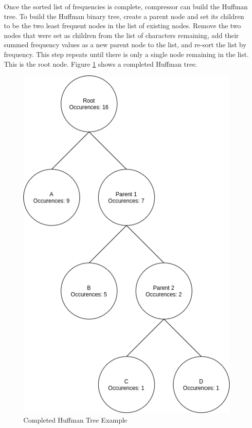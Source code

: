 \documentclass[doublespace,nopageskip]{VTthesis}
\begin{document}
Once the sorted list of frequencies is complete, compressor can build the Huffman tree. To build the Huffman binary tree, create a parent node and set its children to be the two least frequent nodes in the list of existing nodes. Remove the two nodes that were set as children from the list of characters remaining, add their summed frequency values as a new parent node to the list, and re-sort the list by frequency. This step repeats until there is only a single node remaining in the list. This is the root node. Figure \ref{fig:completed_huffman_tree_example} shows a completed Huffman tree.

\begin{figure}[htb]
	\centering
	\includegraphics[scale=0.25]{Huffman Tree Example.png}
	\caption{Completed Huffman Tree Example}
	\label{fig:completed_huffman_tree_example}
\end{figure}
\end{document}
